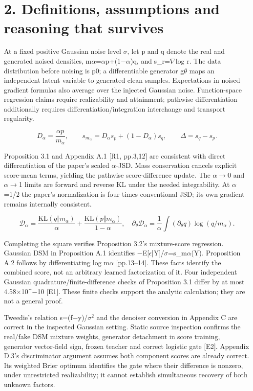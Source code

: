 \documentclass[10pt]{article}
\begin{document}
\section*{2. Definitions, assumptions and reasoning that survives}
At a fixed positive Gaussian noise level \(\sigma\), let p and q denote the real and generated noised densities, m\(\alpha\)=\(\alpha\)p+(1\(-\)\(\alpha\))q, and s\_r=\(\nabla\)log r. The data distribution before noising is p0; a differentiable generator g\(\theta\) maps an independent latent variable to generated clean samples. Expectations in noised gradient formulas also average over the injected Gaussian noise. Function-space regression claims require realizability and attainment; pathwise differentiation additionally requires differentiation/integration interchange and transport regularity.\par
\[D_\alpha=\frac{\alpha p}{m_\alpha},\qquad s_{m_\alpha}=D_\alpha s_p+(1-D_\alpha)s_q,\qquad \Delta=s_q-s_p.\]\par
Proposition 3.1 and Appendix A.1 [R1, pp.3,12] are consistent with direct differentiation of the paper’s scaled \(\alpha\)-JSD. Mass conservation cancels explicit score-mean terms, yielding the pathwise score-difference update. The \(\alpha\)\(\to\)0 and \(\alpha\)\(\to\)1 limits are forward and reverse KL under the needed integrability. At \(\alpha\)=1/2 the paper’s normalization is four times conventional JSD; its own gradient remains internally consistent.\par
\[\mathcal D_\alpha=\frac{\mathrm{KL}(q\Vert m_\alpha)}{\alpha}+\frac{\mathrm{KL}(p\Vert m_\alpha)}{1-\alpha},\quad
\partial_\theta\mathcal D_\alpha=\frac1\alpha\int(\partial_\theta q)\log(q/m_\alpha).\]\par
Completing the square verifies Proposition 3.2’s mixture-score regression. Gaussian DSM in Proposition A.1 identifies \(-\)E[\(\epsilon\)|Y]/\(\sigma\)=s\_m\(\alpha\)(Y). Proposition A.2 follows by differentiating log m\(\alpha\) [pp.13–14]. These facts identify the combined score, not an arbitrary learned factorization of it. Four independent Gaussian quadrature/finite-difference checks of Proposition 3.1 differ by at most 4.58\(\times\)10\textasciicircum{}\(-\)10 [E1]. These finite checks support the analytic calculation; they are not a general proof.\par
Tweedie’s relation s=(f\(-\)y)/\(\sigma\)\({}^{2}\) and the denoiser conversion in Appendix C are correct in the inspected Gaussian setting. Static source inspection confirms the real/fake DSM mixture weights, generator detachment in score training, generator vector-field sign, frozen teacher and correct logistic gate [E2]. Appendix D.3’s discriminator argument assumes both component scores are already correct. Its weighted Brier optimum identifies the gate where their difference is nonzero, under unrestricted realizability; it cannot establish simultaneous recovery of both unknown factors.\par
\end{document}
